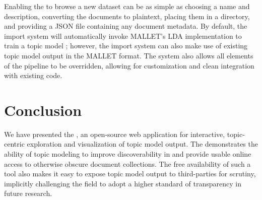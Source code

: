 \documentclass[11pt]{article}
\begin{document}
Enabling the \tool{} to browse a new dataset can be as simple as choosing a name
and description, converting the documents to plaintext, placing them in a
directory, and providing a JSON file containing any document metadata. By default,
the \tool{} import system will automatically invoke MALLET's LDA implementation to train a
topic model \cite{McCallum2002}; however, the import system can also make use of
existing topic model output in the MALLET format. The system also allows all
elements of the pipeline to be overridden, allowing for customization and
clean integration with existing code.

\section{Conclusion}
We have presented the \tool, an open-source web application for interactive,
topic-centric exploration and visualization of topic model output. The \tool{}
demonstrates the ability of topic modeling to improve discoverability in and
provide usable online access to otherwise obscure document collections. The free
availability of such a tool also makes it easy to expose topic model output to
third-parties for scrutiny, implicitly challenging the field to adopt a higher
standard of transparency in future research.


\end{document}
